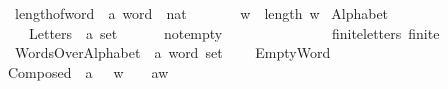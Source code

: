 \begin{isabellebody}
\isanewline
{}\isamarkupfalse%
\ length{\isacharunderscore}{\kern0pt}of{\isacharunderscore}{\kern0pt}word\ {\isacharcolon}{\kern0pt}{\isacharcolon}{\kern0pt}\ {\isachardoublequoteopen}{\isacharprime}{\kern0pt}a\ word\ {\isasymRightarrow}\ nat{\isachardoublequoteclose}\ \ {\isacharparenleft}{\kern0pt}{\isachardoublequoteopen}{\isacharbar}{\kern0pt}{\isacharunderscore}{\kern0pt}{\isacharbar}{\kern0pt}{\isachardoublequoteclose}\ {\isacharbrackleft}{\kern0pt}{}{}{\isacharbrackright}{\kern0pt}\ {}{}{\isacharparenright}{\kern0pt}\ \isanewline
\ \ {\isachardoublequoteopen}{\isacharbar}{\kern0pt}w{\isacharbar}{\kern0pt}\ {\isasymequiv}\ length\ w{\isachardoublequoteclose}%
\isadelimdocument
%
\endisadelimdocument
%
\isatagdocument
%
\isamarkuptrue%
%
\endisatagdocument
{\isafolddocument}%
%
\isadelimdocument
%
\endisadelimdocument
{}\isamarkupfalse%
\ Alphabet\ {\isacharequal}{\kern0pt}\isanewline
\ \ \ Letters\ {\isacharcolon}{\kern0pt}{\isacharcolon}{\kern0pt}\ {\isachardoublequoteopen}{\isacharprime}{\kern0pt}a\ set\ {\isachardoublequoteclose}\ \ {\isacharparenleft}{\kern0pt}{\isachardoublequoteopen}{\isasymSigma}{\isachardoublequoteclose}{\isacharparenright}{\kern0pt}\isanewline
\ \ \ not{\isacharunderscore}{\kern0pt}empty{\isacharcolon}{\kern0pt}\ \ \ \ \ \ {\isachardoublequoteopen}{\isasymSigma}\ {\isasymnoteq}\ {\isacharbraceleft}{\kern0pt}{\isacharbraceright}{\kern0pt}{\isachardoublequoteclose}\isanewline
\ \ \ \ \ \ \ finite{\isacharunderscore}{\kern0pt}letters{\isacharcolon}{\kern0pt}\ {\isachardoublequoteopen}finite\ {\isasymSigma}{\isachardoublequoteclose}\isanewline
{}\isanewline
\isanewline
{}\isamarkupfalse%
\ WordsOverAlphabet\ {\isacharcolon}{\kern0pt}{\isacharcolon}{\kern0pt}\ {\isachardoublequoteopen}{\isacharprime}{\kern0pt}a\ word\ set{\isachardoublequoteclose}\ \ {\isacharparenleft}{\kern0pt}{\isachardoublequoteopen}{\isasymSigma}\isactrlsup {\isacharasterisk}{\kern0pt}{\isachardoublequoteclose}\ {}{}{}{\isacharparenright}{\kern0pt}\ \isanewline
EmptyWord{\isacharcolon}{\kern0pt}\ {\isachardoublequoteopen}{\isasymepsilon}\ {\isasymin}\ {\isasymSigma}\isactrlsup {\isacharasterisk}{\kern0pt}{\isachardoublequoteclose}\ {\isacharbar}{\kern0pt}\isanewline
Composed{\isacharcolon}{\kern0pt}\ \ {\isachardoublequoteopen}{\isasymlbrakk}a\ {\isasymin}\ {\isasymSigma}{\isacharsemicolon}{\kern0pt}\ w\ {\isasymin}\ {\isasymSigma}\isactrlsup {\isacharasterisk}{\kern0pt}{\isasymrbrakk}\ {\isasymLongrightarrow}\ {\isacharparenleft}{\kern0pt}a{\isacharhash}{\kern0pt}w{\isacharparenright}{\kern0pt}\ {\isasymin}\ {\isasymSigma}\isactrlsup {\isacharasterisk}{\kern0pt}{\isachardoublequoteclose}\isanewline

\end{isabellebody}
